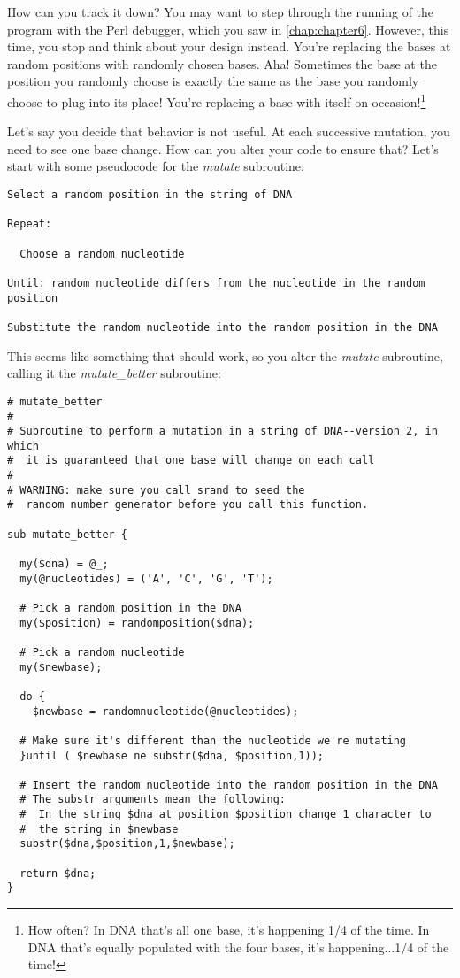 How can you track it down? You may want to step through the running of the program with the Perl debugger, which you saw in \autoref{chap:chapter6}. However, this time, you stop and think about your design instead. You're replacing the bases at random positions with randomly chosen bases. Aha! Sometimes the base at the position you randomly choose is exactly the same as the base you randomly choose to plug into its place! You're replacing a base with itself on occasion!\footnote{How often? In DNA that's all one base, it's happening 1/4 of the time. In DNA that's equally populated with the four bases, it's happening...1/4 of the time!} 

Let's say you decide that behavior is not useful. At each successive mutation, you need to see one base change. How can you alter your code to ensure that? Let's start with some pseudocode for the \textit{mutate} subroutine: 

\begin{lstlisting}
Select a random position in the string of DNA

Repeat:

  Choose a random nucleotide

Until: random nucleotide differs from the nucleotide in the random position

Substitute the random nucleotide into the random position in the DNA
\end{lstlisting}

This seems like something that should work, so you alter the \textit{mutate} subroutine, calling it the \textit{mutate\_better} subroutine: 

\begin{lstlisting}
# mutate_better
#
# Subroutine to perform a mutation in a string of DNA--version 2, in which
#  it is guaranteed that one base will change on each call
#
# WARNING: make sure you call srand to seed the
#  random number generator before you call this function.

sub mutate_better {

  my($dna) = @_;
  my(@nucleotides) = ('A', 'C', 'G', 'T');

  # Pick a random position in the DNA
  my($position) = randomposition($dna);

  # Pick a random nucleotide
  my($newbase);

  do {
    $newbase = randomnucleotide(@nucleotides);

  # Make sure it's different than the nucleotide we're mutating
  }until ( $newbase ne substr($dna, $position,1));

  # Insert the random nucleotide into the random position in the DNA
  # The substr arguments mean the following:
  #  In the string $dna at position $position change 1 character to
  #  the string in $newbase
  substr($dna,$position,1,$newbase);

  return $dna;
}
\end{lstlisting}


